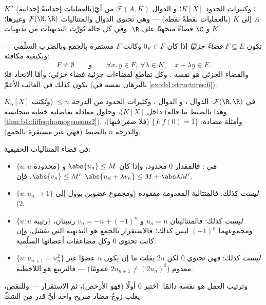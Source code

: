 \begin{example}\label{ex:b1:vspaces:examples}
$K^n$ (بالعمليات إحداثيةً إحداثية)؛ وكثيرات الحدود $K[X]$؛ و
الدوال $\mathcal{F}(A, K)$ من أيّ  $A$ إلى $K$ (بالعمليات
نقطةً نقطة) --- وهي تحتوي الدوال  والمتتاليات
$\mathcal{F}(\N, \R)$ وغيرها؛ و $\C$ فضاءً متجهيًا على $\R$. وفي كل
حالة تُورَّث البديهيات من بديهيات $K$.
\end{example}

\begin{definition}\label{def:b1:vspaces:subspace}
تكون $F \subseteq E$ \emph{فضاءً جزئيًا} إذا كان $0_E \in
F$ وكانت $F$ مستقرة بالجمع وبالضرب السلّمي ---
وبكيفية مكافئة:
\[
F \neq \emptyset
\qquad\text{و}\qquad
\forall x, y \in F,\ \forall \lambda \in K,\quad
x + \lambda y \in F .
\]
والفضاء الجزئي هو نفسه . وكل تقاطع لفضاءات جزئية
فضاء جزئي؛ وأمّا الاتحاد فلا يكون كذلك في الغالب الأعمّ (بالبرهان نفسه في
\cref{exo:b1:structures:6}).
\end{definition}

\begin{example}\label{ex:b1:vspaces:subspaces}
في $\mathcal{F}(\R, \R)$: الدوال ، و
الدوال ، وكثيرات الحدود من الدرجة $\leq n$ (وتُكتب
$K_n[X]$ داخل $K[X]$)، وحلول معادلة تفاضلية خطية
متجانسة (وهذا بالضبط ما قاله \cref{thm:b1:diffeq:homogeneous2}).
وأمثلة مضادة: $\{f : f(0) = 1\}$ (فلا صفر فيها)، والدرجة $n$
بالضبط (فهي غير مستقرة بالجمع).
\end{example}

\begin{example}
\label{ex:b1:vspaces:subspaceornot}
في فضاء المتتاليات الحقيقية:
\begin{itemize}
  \item $\{u : u \text{ محدودة}\}$ \emph{هي} : فالمقدار $0$
        محدود، وإذا كان $\abs{u_n} \leq M$ و $\abs{v_n} \leq M'$،
        فإن $\abs{u_n + \lambda v_n} \leq M + \abs\lambda M'$.
  \item $\{u : u_n \to 1\}$ \emph{ليست} كذلك: فالمتتالية المعدومة
        مفقودة (ومجموع عضوين يؤول إلى $2$).
  \item $\{u : u \text{ رتيبة}\}$ \emph{ليست} كذلك: فالمتتاليتان $u_n = n$
        و $v_n = -n + (-1)^n$ رتيبتان، ومجموعهما
        $(-1)^n$ ليس كذلك؛ فالاستقرار بالجمع هو البديهية
        التي تفشل، وإن كانت  تحتوي $0$ وكل
        مضاعفات أعضائها السلّمية.
  \item $\{u : u_{n+1} = u_n^2\}$ \emph{ليست} كذلك: فهي تحتوي $0$
        لكن $2u$ يفلت ما إن يكون $u$ عضوًا غير معدوم
        ($2u_{n+1} \neq (2u_n)^2$ عمومًا) --- فالتربيع هو
        اللاخطية.
\end{itemize}
وترتيب العمل هو نفسه دائمًا: اختبر $0$ أولًا (فهو الأرخص)،
ثم الاستقرار --- وللنقض، يغلب زوجٌ مضاد صريح واحد
أيَّ قدر من الشكّ.
\end{example}

